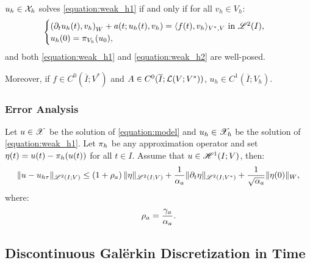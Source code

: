 \begin{proposition}[Equivalence]
    $u_h \in \mathcal{X}_h$ solves \cref{equation:weak_h1} if and only if for all $v_h \in V_h$:
    \begin{align}
        \begin{cases} \label{equation:weak_h2}
            \left( \partial_t u_h(t), v_h \right)_W + a(t; u_h(t), v_h) = \langle f(t), v_h \rangle_{V^*, V} \text{ in } \mathscr{L}^{2}(I), \\
            u_h(0) = \pi_{V_h}(u_0),
        \end{cases}
    \end{align}
    and both \cref{equation:weak_h1} and \cref{equation:weak_h2} are well-posed.

    Moreover, if $f \in C^0(\overline{I}; V^*)$ and $A \in C^0(\overline{I}; \mathcal{L}(V; V^*))$, $u_h \in C^1(\overline{I}; V_h)$.
\end{proposition}

\subsubsection{Error Analysis}




\begin{theorem} \label{theorem:estimate_h}
    Let $u \in \mathscr{X}$ be the solution of \cref{equation:model} and $u_h \in \mathscr{X}_h$ be the solution of \cref{equation:weak_h1}. Let $\pi_h$ be any approximation operator and set $\eta(t) = u(t) - \pi_h(u(t))$ for all $t \in I$. Assume that $u \in \mathscr{H}^{1}(I; V)$, then:
    \begin{align}
        \lVert u - u_{h \tau} \rVert_{\mathscr{L}^{2}(I; V)} \leq \left( 1 + \rho_{a} \right) \lVert \eta \rVert_{\mathscr{L}^{2}(I; V)} + \frac{1}{\alpha_{a}} \lVert \partial_t \eta \rVert_{\mathscr{L}^{2}(I; V^*)} + \frac{1}{\sqrt{\alpha_{a}}} \lVert \eta(0) \rVert_W,
    \end{align}
    where:
    \begin{align}
        \rho_{a} = \frac{\gamma_{a}}{\alpha_{a}}.
    \end{align}
\end{theorem}

\newpage
\subsection{Discontinuous Galërkin Discretization in Time} \label{subsection:time_dg}


